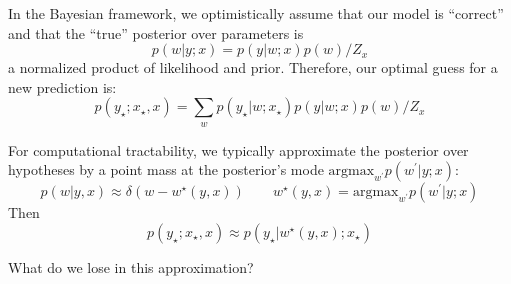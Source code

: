


        In the Bayesian framework, we optimistically assume that our model is
        ``correct'' and that the ``true'' posterior over parameters is
        $$
            p(w|y;x) = p(y|w;x) p(w) / Z_x
        $$
        a normalized product of likelihood and prior.
        Therefore, our optimal guess for a new prediction is:
        $$
            p(y_\star;x_\star, x)
            = \sum_w p(y_\star|w;x_\star) p(y|w;x) p(w) / Z_x
        $$

        For computational tractability, we typically approximate the posterior
        over hypotheses by a point mass at the posterior's mode
        $\text{argmax}_{w^\prime} p(w^\prime|y;x)$:
        $$
            p(w|y,x) \approx \delta(w - w^\star(y,x))
            \quad\quad
            w^\star(y,x)=\text{argmax}_{w^\prime} p(w^\prime|y;x)
        $$
        Then
        $$
            p(y_\star;x_\star, x)
            \approx p(y_\star|w^\star(y,x);x_\star)
        $$

        What do we lose in this approximation?










